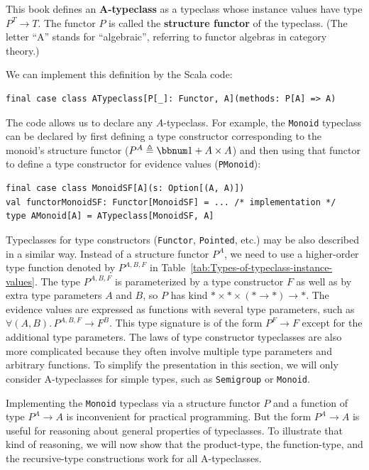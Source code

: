 This book defines  an \textbf{A-typeclass}
as a typeclass whose instance values have type $P^{T}\rightarrow T$.
The functor $P$ is called the \textbf{structure
functor} of the typeclass. (The letter \textsf{``}A\textsf{''} stands for \textsf{``}algebraic\textsf{''},
referring to functor algebras in category theory.) 

We can implement this definition by the Scala code:
\begin{lstlisting}
final case class ATypeclass[P[_]: Functor, A](methods: P[A] => A)
\end{lstlisting}
The code allows us to declare any $A$-typeclass. For example, the
\lstinline!Monoid! typeclass can be declared by first defining a
type constructor corresponding to the monoid\textsf{'}s structure functor ($P^{A}\triangleq\bbnum 1+A\times A$)
and then using that functor to define a type constructor for evidence
values (\lstinline!PMonoid!):
\begin{lstlisting}
final case class MonoidSF[A](s: Option[(A, A)])
val functorMonoidSF: Functor[MonoidSF] = ... /* implementation */
type AMonoid[A] = ATypeclass[MonoidSF, A]
\end{lstlisting}

Typeclasses for type constructors (\lstinline!Functor!, \lstinline!Pointed!,
etc.) may be also described in a similar way. Instead of a structure
functor $P^{A}$, we need to use a higher-order type function denoted
by $P^{A,B,F}$ in Table~\ref{tab:Types-of-typeclass-instance-values}.
The type $P^{A,B,F}$ is parameterized by a type constructor $F$
as well as by extra type parameters $A$ and $B$, so $P$ has kind
$*\times*\times(*\rightarrow*)\rightarrow*$. The evidence values
are expressed as functions with several type parameters, such as $\forall(A,B).\,P^{A,B,F}\rightarrow F^{B}$.
This type signature is of the form $P^{F}\rightarrow F$ except for
the additional type parameters. The laws of type constructor typeclasses
are also more complicated because they often involve multiple type
parameters and arbitrary functions. To simplify the presentation in
this section, we will only consider A-typeclasses for simple types,
such as \lstinline!Semigroup! or \lstinline!Monoid!.

Implementing the \lstinline!Monoid! typeclass via a structure functor
$P$ and a function of type $P^{A}\rightarrow A$ is inconvenient
for practical programming. But the form $P^{A}\rightarrow A$ is useful
for reasoning about general properties of typeclasses. To illustrate
that kind of reasoning, we will now show that the product-type, the
function-type, and the recursive-type constructions work for all A-typeclasses. 


